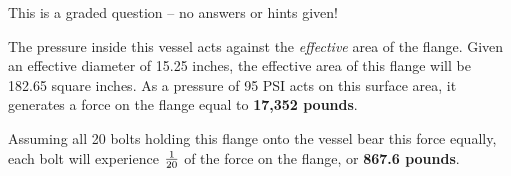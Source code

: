 \vfil

\eject






This is a graded question -- no answers or hints given!







The pressure inside this vessel acts against the {\it effective} area of the flange.  Given an effective diameter of 15.25 inches, the effective area of this flange will be 182.65 square inches.  As a pressure of 95 PSI acts on this surface area, it generates a force on the flange equal to {\bf 17,352 pounds}.

\vskip 10pt

Assuming all 20 bolts holding this flange onto the vessel bear this force equally, each bolt will experience $1 \over 20$ of the force on the flange, or {\bf 867.6 pounds}.





